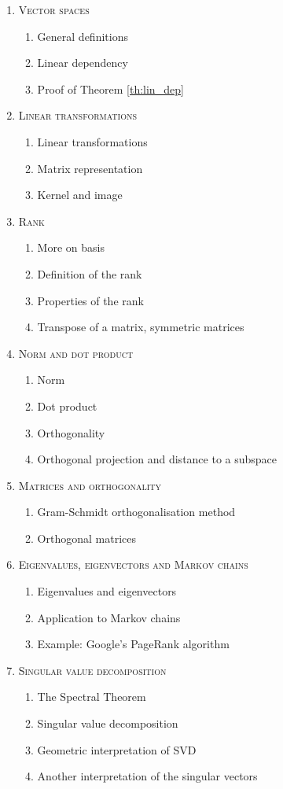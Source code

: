 \begin{enumerate}[label=\textbf{\arabic*.}]
\item \textsc{Vector spaces}
\begin{enumerate}[label=\arabic*.]
\item General definitions
\item Linear dependency
\item Proof of Theorem \ref{th:lin_dep}
\end{enumerate}
\item \textsc{Linear transformations}
\begin{enumerate}[label=\arabic*.]
\item Linear transformations
\item Matrix representation
\item Kernel and image
\end{enumerate}
\item \textsc{Rank}
\begin{enumerate}[label=\arabic*.]
\item More on basis
\item Definition of the rank
\item Properties of the rank
\item Transpose of a matrix, symmetric matrices
\end{enumerate}
\item \textsc{Norm and dot product}
\begin{enumerate}[label=\arabic*.]
\item Norm
\item Dot product
\item Orthogonality
\item Orthogonal projection and distance to a subspace
\end{enumerate}
\item \textsc{Matrices and orthogonality}
\begin{enumerate}[label=\arabic*.]
\item Gram-Schmidt orthogonalisation method
\item Orthogonal matrices
\end{enumerate}
\item \textsc{Eigenvalues, eigenvectors and Markov chains}
\begin{enumerate}[label=\arabic*.]
\item Eigenvalues and eigenvectors
\item Application to Markov chains
\item Example: Google's PageRank algorithm
\end{enumerate}
\item \textsc{Singular value decomposition}
\begin{enumerate}[label=\arabic*.]
\item The Spectral Theorem
\item Singular value decomposition
\item Geometric interpretation of SVD
\item Another interpretation of the singular vectors
\end{enumerate}
\end{enumerate}
